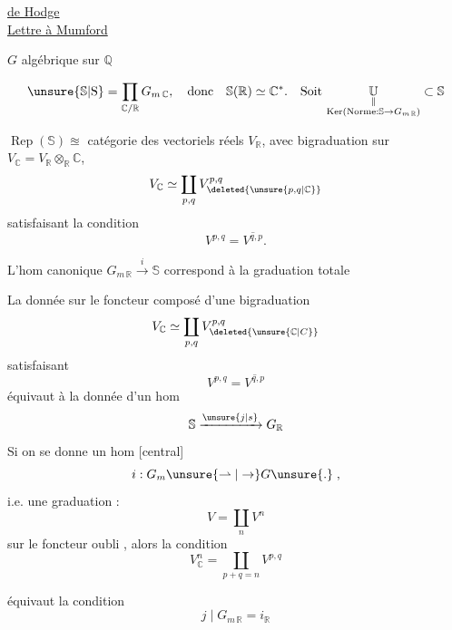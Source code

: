 \begin{flushright}
\uline{ de Hodge}\\
\uline{Lettre à Mumford}
\end{flushright}

$G$  algébrique sur $\mathbb{Q}$

\[
\unsure{\mathbb{S}|\mathrm{S}}=\prod_{\mathbb{C}/\mathbb{R}}G_{m\,\mathbb{C}},\quad
\text{donc}\quad \mathbb{S}(\mathbb{R})\simeq\mathbb{C}^{*}.\quad
\text{Soit }\underset{\substack{\Vert\\
\operatorname{Ker}(\mathrm{Norme}:\mathbb{S}\to G_{m\,\mathbb{R}})}}{\mathbb{U}}\subset\mathbb{S}
\]

$\operatorname{Rep}(\mathbb{S})\approxeq$ catégorie des vectoriels réels $V_{\mathbb{R}}$, avec bigraduation sur $V_{\mathbb{C}}=V_{\mathbb{R}}\otimes_{\mathbb{R}}\mathbb{C}$,
\[
V_{\mathbb{C}}\simeq\coprod_{p,q}V_{\deleted{\unsure{p,q|\mathbb{C}}}}^{p,q}
\]
satisfaisant la condition
\[
V^{p,q}=\overline{V^{q,p}}.
\]

L'hom canonique $G_{m\,\mathbb{R}}\xrightarrow{i}\mathbb{S}$ correspond à la graduation totale


La donnée sur le foncteur composé d'une bigraduation
\[
V_{\mathbb{C}}\simeq\coprod_{p,q}V_{\deleted{\unsure{\mathbb{C}|C}}}^{p,q}
\]
satisfaisant
\[
V^{p,q}=\overline{V^{q,p}}
\]
équivaut à la donnée d'un hom
\[
\mathbb{S}\xrightarrow{\unsure{j|s}}G_{\mathbb{R}}
\]
Si on se donne un hom [central]
\[
i:G_m\unsure{\rightharpoonup|\to}G\unsure{.}\;,
\]
i.e. une graduation :
\[
V=\coprod_n V^n
\]
sur le foncteur oubli , alors la condition
\[
V^n_{\mathbb{C}}=\coprod_{p+q=n}V^{p,q}
\]

équivaut  la condition
\[
j\mid G_{m\,\mathbb{R}}=i_{\mathbb{R}}\tag*{(a)}
\]

